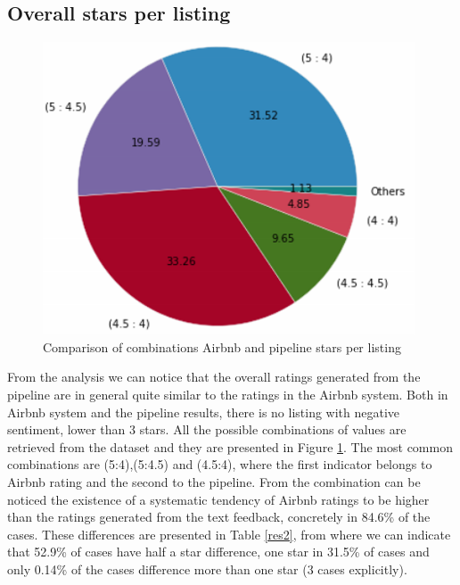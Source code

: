 \subsection{Overall stars per listing}
%
\begin{figure}
\centering
	\includegraphics[height=0.27\textheight]{star_combinations}
	\caption{Comparison of combinations Airbnb and pipeline stars per listing}
	\label{fig:comb1}
\end{figure}
%
From the analysis we can notice that the overall ratings generated from the pipeline are in general quite similar to the ratings in the Airbnb system. Both in Airbnb system and the pipeline results, there is no listing with negative sentiment, lower than 3 stars. All the possible combinations of values are retrieved from the dataset and they are presented in Figure \ref{fig:comb1}. The most common combinations are (5:4),(5:4.5) and (4.5:4), where the first indicator belongs to Airbnb rating and the second to the pipeline. From the combination can be noticed the existence of a systematic tendency of Airbnb ratings to be higher than the ratings generated from the text feedback, concretely in 84.6\% of the cases. These differences are presented in Table \ref{res2}, from where we can indicate that 52.9\% of cases have half a star difference, one star in 31.5\% of cases and only 0.14\% of the cases difference more than one star (3 cases explicitly). 
%
